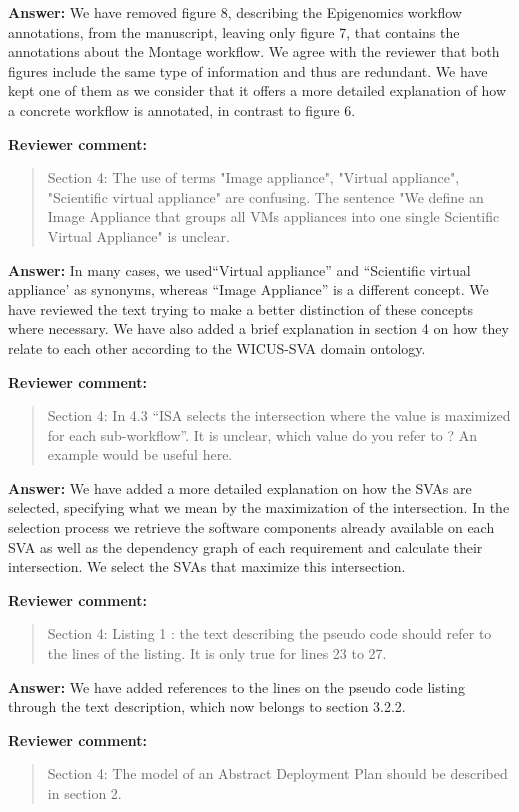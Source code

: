 \documentclass{letter}
\newenvironment{review}%
{\textbf{Reviewer comment:}\begin{quote}}%
{\end{quote}}%
\newcommand{\answer}[1]{%
      \textbf{Answer:} #1}
\begin{document}
\begin{letter}{}
\answer{We have removed figure 8, describing the Epigenomics workflow annotations, from the manuscript, leaving only figure 7, that contains the annotations about the Montage workflow. We agree with the reviewer that both figures include the same type of information and thus are redundant. We have kept one of them as we consider that it offers a more detailed explanation of how a concrete workflow is annotated, in contrast to figure 6.}


\begin{review}
Section 4: The use of terms "Image appliance", "Virtual appliance", "Scientific virtual appliance" are confusing. The sentence "We define an Image Appliance that groups all VMs appliances into one single Scientific Virtual Appliance" is unclear.
\end{review}

\answer{In many cases, we used``Virtual appliance'' and ``Scientific virtual appliance' as synonyms, whereas ``Image Appliance'' is a different concept. We have reviewed the text trying to make a better distinction of these concepts where necessary. We have also added a brief explanation in section 4 on how they relate to each other according to the WICUS-SVA domain ontology.}

\begin{review}
Section 4: In 4.3 ``ISA selects the intersection where the value is maximized for each sub-workflow''. It is unclear, which value do you refer to ? An example would be useful here.
\end{review}

\answer{We have added a more detailed explanation on how the SVAs are selected, specifying what we mean by the maximization of the intersection. In the selection process we retrieve the software components already available on each SVA as well as the dependency graph of each requirement and calculate their intersection. We select the SVAs that maximize this intersection.}


\begin{review}
Section 4: Listing 1 : the text describing the pseudo code should refer to the lines of the listing. It is only true for lines 23 to 27.
\end{review}

\answer{We have added references to the lines on the pseudo code listing through the text description, which now belongs to section 3.2.2.}


\begin{review}
Section 4: The model of an Abstract Deployment Plan should be described in section 2.
\end{review}


\end{letter}
\end{document}
